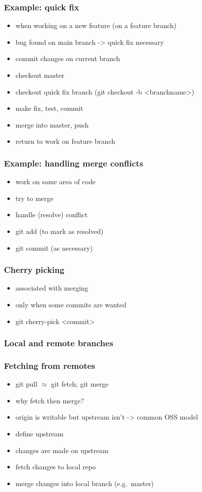 \documentclass{git_course}
\begin{document}
\begin{frame}
\frametitle{Example: quick fix}
\begin{itemize}
    \item when working on a new feature (on a feature branch)
    \item bug found on main branch -> quick fix necessary
    \item commit changes on current branch
    \item checkout master
    \item checkout quick fix branch (git checkout -b <branchname>)
    \item make fix, test, commit
    \item merge into master, push
    \item return to work on feature branch
\end{itemize}
\end{frame}

\begin{frame}
\frametitle{Example: handling merge conflicts}
\begin{itemize}
    \item work on same area of code
    \item try to merge
    \item handle (resolve) conflict
    \item git add (to mark as resolved)
    \item git commit (as necessary)
\end{itemize}
\end{frame}

\begin{frame}
\frametitle{Cherry picking}
\begin{itemize}
    \item associated with merging
    \item only when some commits are wanted
    \item git cherry-pick <commit>
\end{itemize}
\end{frame}

\begin{frame}
\frametitle{Local and remote branches}
\end{frame}

\begin{frame}
\frametitle{Fetching from remotes}
\begin{itemize}
    \item git pull $\approx$ git fetch; git merge
    \item why fetch then merge?
    \item origin is writable but upstream isn't -> common OSS model
    \item define upstream
    \item changes are made on upstream
    \item fetch changes to local repo
    \item merge changes into local branch (e.g.\ master)
\end{itemize}
\end{frame}
\end{document}
